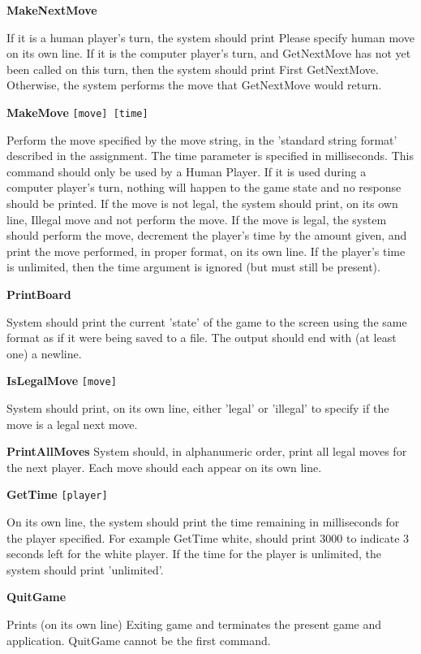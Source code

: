 		\textbf{MakeNextMove}
    
    If it is a human player's turn, the system should print Please specify human move 
    on its own line. If it is the computer player's turn, and GetNextMove has not yet 
    been called on this turn, then the system should print First GetNextMove. Otherwise, 
    the system performs the move that GetNextMove would return. 
		
		\textbf{MakeMove} \texttt{[move] [time]}
    
    Perform the move specified by the move string, in the 'standard string format' described 
 	  in the assignment. The time parameter is specified in milliseconds. This command should 
    only be used by a Human Player. If it is used during a computer player's turn, nothing 
  	will happen to the game state and no response should be printed. If the move is not legal,
    the system should print, on its own line, Illegal move and not perform the move. If 
    the move is legal, the system should perform the move, decrement the player's time by 
    the amount given, and print the move performed, in proper format, on its own line. If 
    the player's time is unlimited, then the time argument is ignored (but must still be present).

		\textbf{PrintBoard}
    
    System should print the current 'state' of the game to the screen using the same format 
    as if it were being saved to a file. The output should end with (at least one) a newline.

		\textbf{IsLegalMove} \texttt{[move]}
    
    System should print, on its own line, either 'legal' or 'illegal' to specify if the move 
    is a legal next move.

		\textbf{PrintAllMoves}
    System should, in alphanumeric order, print all legal moves for the next player. Each move 
    should each appear on its own line.
		
		\textbf{GetTime} \texttt{[player]}
    
    On its own line, the system should print the time remaining in milliseconds for the player 
    specified. For example GetTime white, should print 3000 to indicate 3 seconds left for the 
    white player. If the time for the player is unlimited, the system should print 'unlimited'.

		\textbf{QuitGame}
    
    Prints (on its own line) Exiting game and terminates the present game and application. 
    QuitGame cannot be the first command.

